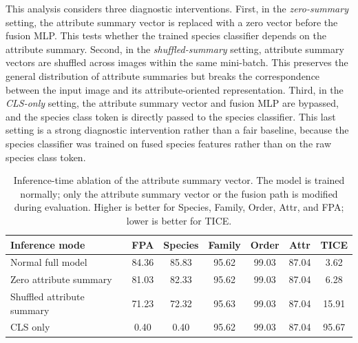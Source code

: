 This analysis considers three diagnostic interventions. First, in the \textit{zero-summary} setting, the attribute summary vector is replaced with a zero vector before the fusion MLP. This tests whether the trained species classifier depends on the attribute summary. Second, in the \textit{shuffled-summary} setting, attribute summary vectors are shuffled across images within the same mini-batch. This preserves the general distribution of attribute summaries but breaks the correspondence between the input image and its attribute-oriented representation. Third, in the \textit{CLS-only} setting, the attribute summary vector and fusion MLP are bypassed, and the species class token is directly passed to the species classifier. This last setting is a strong diagnostic intervention rather than a fair baseline, because the species classifier was trained on fused species features rather than on the raw species class token.

\begin{table}[t]
    \centering
    \caption{
    Inference-time ablation of the attribute summary vector. 
    The model is trained normally; only the attribute summary vector or the fusion path is modified during evaluation. 
    Higher is better for Species, Family, Order, Attr, and FPA; lower is better for TICE.
    }
    \label{tab:inference_attr_summary_ablation}
    \small
    \setlength{\tabcolsep}{4pt}
    \renewcommand{\arraystretch}{1.12}
    \begin{tabular}{lcccccc}
        \hline
        \textbf{Inference mode}
        & \textbf{FPA}
        & \textbf{Species} 
        & \textbf{Family} 
        & \textbf{Order} 
        & \textbf{Attr}  
        & \textbf{TICE} \\
        \hline

        Normal full model
        & 84.36 & 85.83 & 95.62 & 99.03 & 87.04 & 3.62 \\

        Zero attribute summary
        & 81.03 & 82.33 & 95.62 & 99.03 & 87.04 & 6.28 \\

        Shuffled attribute summary
        & 71.23 & 72.32 & 95.63 & 99.03 & 87.04 & 15.91 \\

        CLS only
        & 0.40 & 0.40 & 95.62 & 99.03 & 87.04 & 95.67 \\
        \hline
    \end{tabular}
\end{table}

